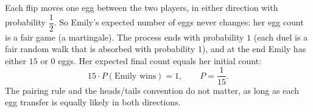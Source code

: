 Each flip moves one egg between the two players, in either direction with probability $\dfrac{1}{2}$. So Emily's expected number of eggs never changes: her egg count is a fair game (a martingale). The process ends with probability $1$ (each duel is a fair random walk that is absorbed with probability $1$), and at the end Emily has either $15$ or $0$ eggs. Her expected final count equals her initial count:
\[15\cdot P(\text{Emily wins})=1,\qquad P=\boxed{\dfrac{1}{15}}.\]
The pairing rule and the heads/tails convention do not matter, as long as each egg transfer is equally likely in both directions.
